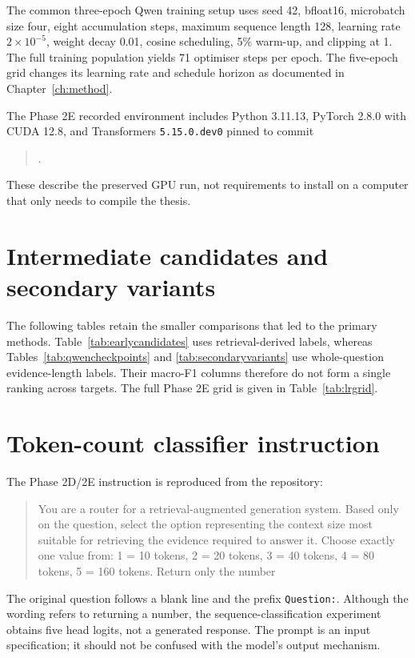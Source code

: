 The common three-epoch Qwen training setup uses seed 42, bfloat16,
microbatch size four, eight accumulation steps, maximum sequence
length 128, learning rate $2\times10^{-5}$, weight decay 0.01,
cosine scheduling, 5\% warm-up, and clipping at 1. The full training
population yields 71 optimiser steps per epoch. The five-epoch grid
changes its learning rate and schedule horizon as documented in
Chapter~\ref{ch:method}.

The Phase 2E recorded environment includes Python 3.11.13,
PyTorch 2.8.0 with CUDA 12.8, and Transformers
\texttt{5.15.0.dev0} pinned to commit
\begin{quote}\small
{}.
\end{quote}
These describe the preserved GPU run, not requirements to install
on a computer that only needs to compile the thesis.



\section{Intermediate candidates and secondary variants}
The following tables retain the smaller comparisons that led to the
primary methods. Table~\ref{tab:earlycandidates} uses retrieval-derived
labels, whereas Tables~\ref{tab:qwencheckpoints} and
\ref{tab:secondaryvariants} use whole-question evidence-length labels.
Their macro-F1 columns therefore do not form a single ranking across
targets. The full Phase 2E grid is given in Table~\ref{tab:lrgrid}.





\section{Token-count classifier instruction}
The Phase 2D/2E instruction is reproduced from the repository:
\begin{quote}
You are a router for a retrieval-augmented generation system. Based
only on the question, select the option representing the context
size most suitable for retrieving the evidence required to answer
it. Choose exactly one value from: 1 = 10 tokens, 2 = 20 tokens,
3 = 40 tokens, 4 = 80 tokens, 5 = 160 tokens. Return only the number
\end{quote}
The original question follows a blank line and the prefix
\texttt{Question:}. Although the wording refers to returning a number,
the sequence-classification experiment obtains five head logits,
not a generated response. The prompt is an input specification;
it should not be confused with the model's output mechanism.


